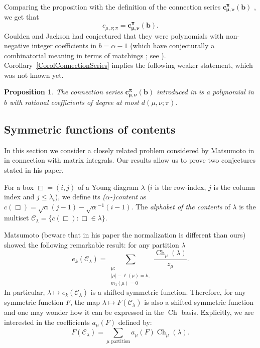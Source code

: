 \documentclass[11pt]{amsart}
\theoremstyle{plain}
\newtheorem{proposition}[lemma]{Proposition}
\theoremstyle{remark}
\newcommand{\CCC}{\mathcal{C}}
\DeclareMathOperator{\Ch}{Ch}
\begin{document}
Comparing the proposition with the definition of the connection series 
$\bm{c_{\mu,\nu}^\pi(b)}$ \cite[equations (1) and (5)]{GouldenJacksonMatchingJack},
we get that
\begin{equation}
    c_{\mu,\nu;\pi} = \bm{c_{\mu,\nu}^\pi(b)}.
    \label{EqIdentificationWithGJ}
\end{equation}
Goulden and Jackson had conjectured that they were polynomials
with non-negative integer coefficients in $b=\alpha-1$
(which have
conjecturally a combinatorial meaning in terms of matchings ;
see \cite[Section 4]{GouldenJacksonMatchingJack}).
Corollary~\ref{CorolConnectionSeries} implies the following weaker statement,
which was not known yet.

\begin{proposition}
    The connection series $\bm{c_{\mu,\nu}^\pi(b)}$ introduced in \cite{GouldenJacksonMatchingJack}
    is a polynomial in $b$ with rational coefficients of degree at most $d(\mu,\nu;\pi)$.
\end{proposition}

\subsection{Symmetric functions of contents}\label{SubsectMatsumoto}
In this section we consider a closely related problem
considered by Matsumoto in \cite[Section 8]{MatsumotoOddJM}
in connection with matrix integrals.
Our results allow us to prove two conjectures stated in his paper.

For a box $\Box =(i,j)$ of a Young diagram $\lambda$ ($i$ is the row-index,
$j$ is the column index and $j\le \lambda_i$), we define its
\emph{($\alpha$-)content}
as $c(\Box) = \sqrt{\alpha} (j-1) - \sqrt{\alpha}^{-1} (i-1)$.
The \emph{alphabet of the contents} of $\lambda$ is the multiset 
$\CCC_\lambda=\{c(\Box) : \Box \in \lambda\}$.

Matsumoto \cite[Equation (8.9)]{MatsumotoOddJM} (beware that in his paper the
normalization is different than ours) showed the following remarkable result: for any partition $\lambda$
\begin{equation}
    e_k(\CCC_\lambda) = \sum_{\substack{\mu: \\ |\mu|-\ell(\mu)=k,\\ m_1(\mu)=0}}
    \frac{\Ch_\mu(\lambda)}{z_\mu}.
    \label{EqElemJM}
\end{equation}
In particular, $\lambda \mapsto e_k(\CCC_\lambda)$ is a shifted symmetric function.
Therefore, for any symmetric function $F$, the map $\lambda \mapsto F(\CCC_\lambda)$
is also a shifted symmetric function and one may wonder how it can be expressed in the $\Ch$ basis.
Explicitly, we are interested in the coefficients $a_\mu(F)$ defined by:
\begin{equation}\label{DefAMuF}
    F(\CCC_\lambda) = \sum_{\mu \text{ partition}}
a_\mu(F) \Ch_\mu(\lambda).
\end{equation}
\end{document}
